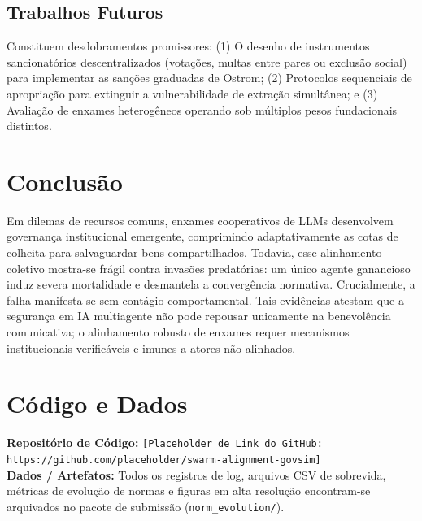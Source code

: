 ﻿\documentclass[11pt,a4paper]{article}
\begin{document}
\subsection{Trabalhos Futuros}
Constituem desdobramentos promissores: (1) O desenho de instrumentos sancionatórios descentralizados (votações, multas entre pares ou exclusão social) para implementar as sanções graduadas de Ostrom; (2) Protocolos sequenciais de apropriação para extinguir a vulnerabilidade de extração simultânea; e (3) Avaliação de enxames heterogêneos operando sob múltiplos pesos fundacionais distintos.

\section{Conclusão}
Em dilemas de recursos comuns, enxames cooperativos de LLMs desenvolvem governança institucional emergente, comprimindo adaptativamente as cotas de colheita para salvaguardar bens compartilhados. Todavia, esse alinhamento coletivo mostra-se frágil contra invasões predatórias: um único agente ganancioso induz severa mortalidade e desmantela a convergência normativa. Crucialmente, a falha manifesta-se sem contágio comportamental. Tais evidências atestam que a segurança em IA multiagente não pode repousar unicamente na benevolência comunicativa; o alinhamento robusto de enxames requer mecanismos institucionais verificáveis e imunes a atores não alinhados.

\section*{Código e Dados}
\textbf{Repositório de Código:} \texttt{[Placeholder de Link do GitHub: https://github.com/placeholder/swarm-alignment-govsim]} \\
\textbf{Dados / Artefatos:} Todos os registros de log, arquivos CSV de sobrevida, métricas de evolução de normas e figuras em alta resolução encontram-se arquivados no pacote de submissão (\texttt{norm\_evolution/}).
\end{document}
